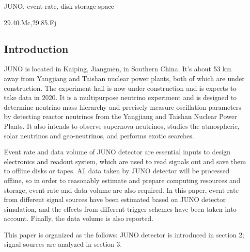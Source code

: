 \documentclass[a4paper,10pt,twoside]{paper}
\begin{document}
	\begin{keyword}
		JUNO, event rate, disk storage space
	\end{keyword}

	\begin{pacs}
		29.40.Mc,29.85.Fj
	\end{pacs}


	\begin{multicols}{2}

		\section{Introduction}
		JUNO\cite{lab1} is located in Kaiping, Jiangmen, in Southern China.
                It's about 53 km away from Yangjiang and Taishan nuclear power plants, both of which are under construction.
                The experiment hall is now under construction and is expects to take data in 2020.
		It is a multipurpose neutrino experiment and is
		designed to determine neutrino mass hierarchy and precisely
		measure oscillation parameters by detecting reactor
		neutrinos from the Yangjiang and Taishan Nuclear Power
		Plants. It also intends to observe supernova neutrinos,
		studies the atmospheric, solar neutrinos and geo-neutrinos,
		and performs exotic searches.

                Event rate and data volume of JUNO detector are essential inputs to design electronics and readout system, 
                which are used to read signals out and save them to offline disks or tapes. 
                All data taken by JUNO detector will be processed offline, so in order to reasonably estimate and prepare computing resources and storage, 
                event rate and data volume are also required.
                In this paper, event rate from different signal sources have been estimated based on JUNO detector simulation, 
                and the effects from different trigger schemes have been taken into account. Finally, the data volume is also reported.

                This paper is organized as the follows: JUNO detector is introduced in section 2; signal sources are analyzed in section 3.


\end{multicols}
\end{document}
